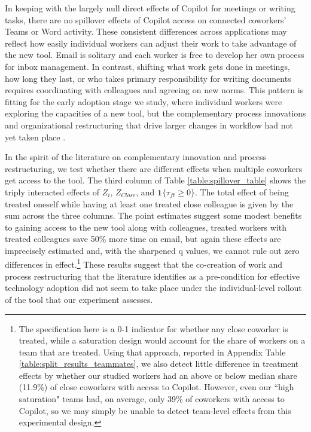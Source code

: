 \documentclass{article}
\begin{document}
In keeping with the largely null direct effects of Copilot for meetings or writing tasks, there are no spillover effects of Copilot access on connected coworkers' Teams or Word activity. These consistent differences across applications may reflect how easily individual workers can adjust their work to take advantage of the new tool. Email is solitary and each worker is free to develop her own process for inbox management. In contrast, shifting what work gets done in meetings, how long they last, or who takes primary responsibility for writing documents requires coordinating with colleagues and agreeing on new norms. This pattern is fitting for the early adoption stage we study, where individual workers were exploring the capacities of a new tool, but the complementary process innovations and organizational restructuring that drive larger changes in workflow had not yet taken place \citep{bresnahan1996technical, brynjolfsson2000beyond}.

In the spirit of the literature on complementary innovation and process restructuring, we test whether there are different effects when multiple coworkers get access to the tool. The third column of Table \ref{table:spillover_table} shows the triply interacted effects of $Z_i$, $Z_{Close}$, and $\mathbf{1}\{\tau_{ft}\geq0\}$. The total effect of being treated oneself while having at least one treated close colleague is given by the sum across the three columns. The point estimates suggest some modest benefits to gaining access to the new tool along with colleagues, treated workers with treated colleagues save 50\% more time on email, but again these effects are imprecisely estimated and, with the sharpened q values, we cannot rule out zero differences in effect.\footnote{The specification here is a 0-1 indicator for whether any close coworker is treated, while a saturation design would account for the share of workers on a team that are treated.  Using that approach, reported in Appendix Table \ref{table:split_results_teammates}, we also detect little difference in treatment effects by whether our studied workers had an above or below median share (11.9\%) of close coworkers with access to Copilot. However, even our ``high saturation" teams had, on average, only 39\% of coworkers with access to Copilot, so we may simply be unable to detect team-level effects from this experimental design.} These results suggest that the co-creation of work and process restructuring that the literature identifies as a pre-condition for effective technology adoption did not seem to take place under the individual-level rollout of the tool that our experiment assesses.
\end{document}
